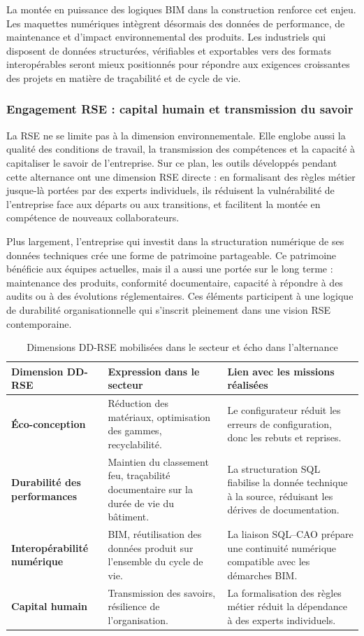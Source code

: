 La montée en puissance des logiques BIM dans la construction renforce cet enjeu. Les maquettes numériques intègrent désormais des données de performance, de maintenance et d'impact environnemental des produits. Les industriels qui disposent de données structurées, vérifiables et exportables vers des formats interopérables seront mieux positionnés pour répondre aux exigences croissantes des projets en matière de traçabilité et de cycle de vie.
 
\subsubsection{Engagement RSE : capital humain et transmission du savoir}
 
La RSE ne se limite pas à la dimension environnementale. Elle englobe aussi la qualité des conditions de travail, la transmission des compétences et la capacité à capitaliser le savoir de l'entreprise. Sur ce plan, les outils développés pendant cette alternance ont une dimension RSE directe : en formalisant des règles métier jusque-là portées par des experts individuels, ils réduisent la vulnérabilité de l'entreprise face aux départs ou aux transitions, et facilitent la montée en compétence de nouveaux collaborateurs.
 
Plus largement, l'entreprise qui investit dans la structuration numérique de ses données techniques crée une forme de patrimoine partageable. Ce patrimoine bénéficie aux équipes actuelles, mais il a aussi une portée sur le long terme : maintenance des produits, conformité documentaire, capacité à répondre à des audits ou à des évolutions réglementaires. Ces éléments participent à une logique de durabilité organisationnelle qui s'inscrit pleinement dans une vision RSE contemporaine.
 
\begin{table}[H]
\centering
\caption{Dimensions DD-RSE mobilisées dans le secteur et écho dans l'alternance}
\begin{tabularx}{\textwidth}{>{\bfseries}p{}X X}
\toprule
Dimension DD-RSE & Expression dans le secteur & Lien avec les missions réalisées \\
\midrule
Éco-conception & Réduction des matériaux, optimisation des gammes, recyclabilité. & Le configurateur réduit les erreurs de configuration, donc les rebuts et reprises. \\
Durabilité des performances & Maintien du classement feu, traçabilité documentaire sur la durée de vie du bâtiment. & La structuration SQL fiabilise la donnée technique à la source, réduisant les dérives de documentation. \\
Interopérabilité numérique & BIM, réutilisation des données produit sur l'ensemble du cycle de vie. & La liaison SQL--CAO prépare une continuité numérique compatible avec les démarches BIM. \\
Capital humain & Transmission des savoirs, résilience de l'organisation. & La formalisation des règles métier réduit la dépendance à des experts individuels. \\
\bottomrule
\end{tabularx}
\end{table}

